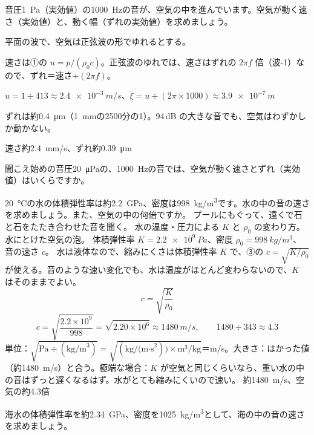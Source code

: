 \begin{reidai}
\label{ph:波-9:ex3}音圧\qty{1}{Pa}（実効値）の\qty{1000}{Hz}の音が、空気の中を進んでいます。空気が動く速さ（実効値）と、動く幅（ずれの実効値）を求めましょう。
\par{} 平面の波で、空気は正弦波の形でゆれるとする。
\par\kangaekata 速さは①の $u=p/(\rho_0c)$。正弦波のゆれでは、速さはずれの $2\pi f$ 倍（波-1）なので、ずれ＝速さ÷$(2\pi f)$。
\par\shiki $u=1\div413\approx\qty{2.4e-3}{m/s}$、$\xi=u\div(2\pi\times1000)\approx\qty{3.9e-7}{m}$
\par{} ずれは約\qty{0.4}{\micro m}（\qty{1}{mm}の2500分の1）。94\,dB の大きな音でも、空気はわずかしか動かない。
\par\kotae 速さ約\qty{2.4}{mm/s}、ずれ約\qty{0.39}{\micro m}
\end{reidai}
\begin{jibun}
聞こえ始めの音圧\qty{20}{\micro Pa}の、\qty{1000}{Hz}の音では、空気が動く速さとずれ（実効値）はいくらですか。
\end{jibun}

\begin{phreidai}[水の中の音の速さ]
\label{ph:波-9:ex4}\qty{20}{\celsius}の水の体積弾性率は約\qty{2.2}{GPa}、密度は\qty{998}{kg/m^3}です。水の中の音の速さを求めましょう。また、空気の中の何倍ですか。
\phbamen
プールにもぐって、遠くで石と石をたたき合わせた音を聞く。
\phmushi
水の温度・圧力による $K$ と $\rho_0$ の変わり方。水にとけた空気の泡。
\phzu
体積弾性率 $K=\qty{2.2e9}{Pa}$、密度 $\rho_0=\qty{998}{kg/m^3}$、音の速さ $c$。
\phriyu
水は液体なので、縮みにくさは体積弾性率 $K$ で、③の $c=\sqrt{K/\rho_0}$ が使える。音のような速い変化でも、水は温度がほとんど変わらないので、$K$ はそのままでよい。
\phtateru
\[ c=\sqrt{\frac{K}{\rho_0}} \]
\phtoku
\[ c=\sqrt{\frac{2.2\times10^9}{998}}=\sqrt{2.20\times10^6}\approx\qty{1480}{m/s},\qquad 1480\div343\approx4.3 \]
\phtashikame
単位：$\sqrt{\text{Pa}\div(\text{kg/m}^3)}=\sqrt{(\text{kg/(m·s}^2))\times\text{m}^3/\text{kg}}$＝m/s。大きさ：はかった値（約\qty{1480}{m/s}）と合う。極端な場合：$K$ が空気と同じくらいなら、重い水の中の音はずっと遅くなるはず。水がとても縮みにくいので速い。
\kotae 約\qty{1480}{m/s}、空気の約4.3倍
\end{phreidai}
\begin{jibun}
海水の体積弾性率を約\qty{2.34}{GPa}、密度を\qty{1025}{kg/m^3}として、海の中の音の速さを求めましょう。
\end{jibun}

